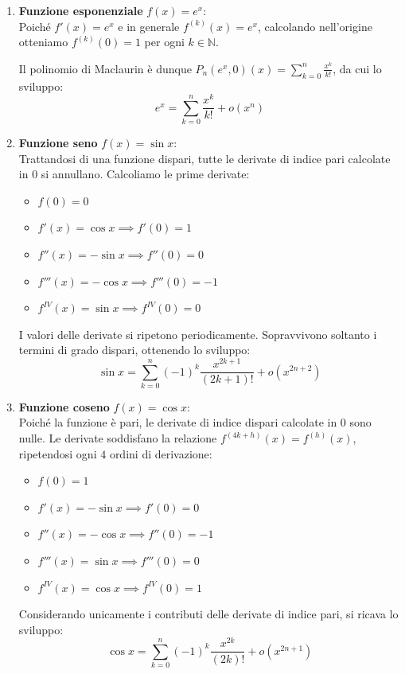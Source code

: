 \documentclass[12pt]{report}
\newcommand{\N}{\mathbb{N}}
\begin{document}
	\begin{enumerate}
		
		\item \textbf{Funzione esponenziale} $f(x) = e^x$:\\
		Poiché $f'(x) = e^x$ e in generale $f^{(k)}(x) = e^x$, calcolando nell'origine otteniamo $f^{(k)}(0) = 1$ per ogni $k \in \N$.
		
		Il polinomio di Maclaurin è dunque $P_n(e^x, 0)(x) = \sum_{k=0}^{n} \frac{x^k}{k!}$, da cui lo sviluppo:
		\[
		e^x = \sum_{k=0}^{n} \frac{x^k}{k!} + o(x^n)
		\]
		
		\item \textbf{Funzione seno} $f(x) = \sin x$:\\
		Trattandosi di una funzione dispari, tutte le derivate di indice pari calcolate in $0$ si annullano. Calcoliamo le prime derivate:
		\begin{itemize}
			
			\item $f(0) = 0$
			
			\item $f'(x) = \cos x \implies f'(0) = 1$
			
			\item $f''(x) = -\sin x \implies f''(0) = 0$
			
			\item $f'''(x) = -\cos x \implies f'''(0) = -1$
			
			\item $f^{IV}(x) = \sin x \implies f^{IV}(0) = 0$
			
		\end{itemize}
		I valori delle derivate si ripetono periodicamente. Sopravvivono soltanto i termini di grado dispari, ottenendo lo sviluppo:
		\[
		\sin x = \sum_{k=0}^{n} (-1)^k \frac{x^{2k+1}}{(2k+1)!} + o(x^{2n+2})
		\]
		
		\item \textbf{Funzione coseno} $f(x) = \cos x$:\\
		Poiché la funzione è pari, le derivate di indice dispari calcolate in $0$ sono nulle. Le derivate soddisfano la relazione $f^{(4k+h)}(x) = f^{(h)}(x)$, ripetendosi ogni $4$ ordini di derivazione:
		\begin{itemize}
			
			\item $f(0) = 1$
			
			\item $f'(x) = -\sin x \implies f'(0) = 0$
			
			\item $f''(x) = -\cos x \implies f''(0) = -1$
			
			\item $f'''(x) = \sin x \implies f'''(0) = 0$
			
			\item $f^{IV}(x) = \cos x \implies f^{IV}(0) = 1$
			
		\end{itemize}
		Considerando unicamente i contributi delle derivate di indice pari, si ricava lo sviluppo:
		\[
		\cos x = \sum_{k=0}^{n} (-1)^k \frac{x^{2k}}{(2k)!} + o(x^{2n+1})
		\]
	\end{enumerate}
	
\end{document}
